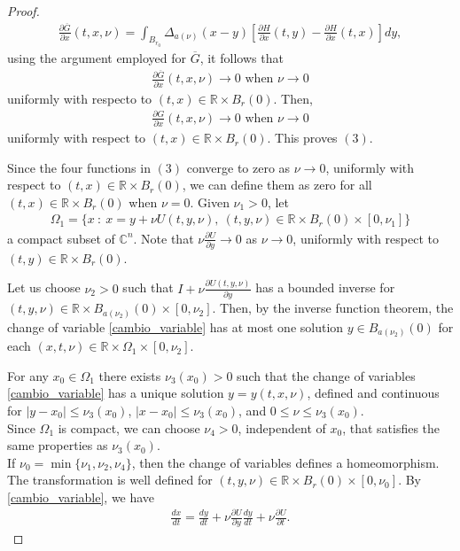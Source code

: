 \documentclass[10pt,a4paper]{amsart}
\newcommand{\bb}[1]{{\mathbb{#1}}}
\begin{document}
\begin{proof}
\begin{eqnarray*}
\frac{\partial\overline{G}}{\partial x}(t,x,\nu)=\int_{B_{r_0}} \Delta_{a(\nu)}(x-y)[\frac{\partial H}{\partial x}(t,y)-\frac{\partial H}{\partial x}(t,x)]dy,
\end{eqnarray*}
using the argument employed for $\overline{G}$, it follows that
\begin{eqnarray*}
\frac{\partial\overline{G}}{\partial x}(t,x,\nu)\rightarrow 0 \mbox{  when } \nu\rightarrow 0
\end{eqnarray*}
uniformly with respecto to $(t,x)\in\bb{R}\times B_{r}(0)$. Then,
\begin{eqnarray*}
\frac{\partial G}{\partial x}(t,x,\nu)\rightarrow 0 \mbox{  when } \nu\rightarrow 0
\end{eqnarray*}
uniformly with respect to $(t,x)\in\bb{R}\times B_{r}(0)$. This proves $(3)$.

Since the four functions in $(3)$ converge to zero as $\nu\rightarrow 0$, uniformly with respect to $(t,x)\in\mathbb{R}\times B_{r}(0)$, we can define them as zero for all $(t,x)\in\mathbb{R}\times B_{r}(0)$ when $\nu=0$. Given $\nu_1>0$, let 
\begin{eqnarray*}
\Omega_1 = \{ x\ :\  x=y+\nu U(t,y,\nu),\ (t,y,\nu) \in \bb{R} \times B_{r}(0) \times [0,\nu_1] \}
\end{eqnarray*}
a compact subset of $\bb{C}^n$. Note that $\nu \frac{\partial U }{\partial y}\rightarrow 0$ as $\nu\rightarrow 0$, uniformly with respect to $(t,y)\in\mathbb{R}\times B_{r}(0)$.

Let us choose $\nu_2>0$ such that $I+\nu\frac{\partial U (t,y,\nu)}{\partial y}$ has a bounded inverse for $(t,y,\nu)\in\mathbb{R}\times B_{a(\nu_2)}(0)\times[0,\nu_2]$.  
Then, by the inverse function theorem, the change of variable \eqref{cambio_variable} has at most one solution $y\in B_{a(\nu_2)}(0)$ for each $(x,t,\nu)\in \mathbb{R}\times \Omega_1 \times [0,\nu_2]$.

For any $x_{0}\in\Omega_{1}$ there exists $\nu_{3}(x_{0})>0$ such that the change of variables \eqref{cambio_variable} has a unique solution $y=y(t,x,\nu)$, defined and continuous for $\lvert y-x_{0}\rvert\le \nu_{3}(x_{0})$, $\lvert x-x_{0}\rvert\le \nu_{3}(x_{0})$, and $0\le \nu\le \nu_{3}(x_{0})$.\\
Since $\Omega_{1}$ is compact, we can choose $\nu_{4}>0$, independent of $x_{0}$, that satisfies the same properties as $\nu_{3}(x_{0})$.\\
If $\nu_{0}=\min\{\nu_{1},\nu_{2},\nu_{4}\}$, then the change of variables defines a homeomorphism. The transformation is well defined for $(t,y,\nu)\in\bb{R}\times B_{r}(0)\times[0,\nu_{0}]$.
By \eqref{cambio_variable}, we have
\begin{eqnarray*}
\frac{dx}{dt}=\frac{dy}{dt}+\nu \frac{\partial U}{\partial y}\frac{dy}{dt}+\nu\frac{\partial U}{\partial t}.
\end{eqnarray*}


\end{proof}
\end{document}

